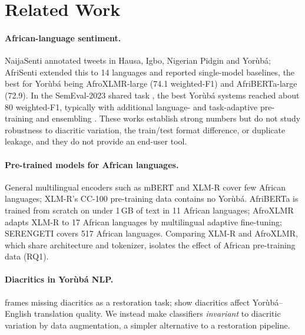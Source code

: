 \documentclass[11pt]{article}
\begin{document}
\section{Related Work}
\paragraph{African-language sentiment.} NaijaSenti \citep{muhammad-etal-2022-naijasenti} annotated tweets in Hausa, Igbo, Nigerian Pidgin and Yorùbá; AfriSenti \citep{muhammad-etal-2023-afrisenti} extended this to 14 languages and reported single-model baselines, the best for Yorùbá being AfroXLMR-large (74.1 weighted-F1) and AfriBERTa-large (72.9). In the SemEval-2023 shared task \citep{muhammad-etal-2023-semeval}, the best Yorùbá systems reached about 80 weighted-F1, typically with additional language- and task-adaptive pre-training and ensembling \citep{wang-etal-2023-nlnde}. These works establish strong numbers but do not study robustness to diacritic variation, the train/test format difference, or duplicate leakage, and they do not provide an end-user tool.

\paragraph{Pre-trained models for African languages.} General multilingual encoders such as mBERT \citep{devlin-etal-2019-bert} and XLM-R \citep{conneau-etal-2020-unsupervised} cover few African languages; XLM-R's CC-100 pre-training data contains no Yorùbá. AfriBERTa \citep{ogueji-etal-2021-small} is trained from scratch on under 1\,GB of text in 11 African languages; AfroXLMR \citep{alabi-etal-2022-adapting} adapts XLM-R to 17 African languages by multilingual adaptive fine-tuning; SERENGETI \citep{adebara-etal-2023-serengeti} covers 517 African languages. Comparing XLM-R and AfroXLMR, which share architecture and tokenizer, isolates the effect of African pre-training data (RQ1).

\paragraph{Diacritics in Yorùbá NLP.} \citet{orife-2018-attentive} frames missing diacritics as a restoration task; \citet{adelani-etal-2021-effect} show diacritics affect Yorùbá--English translation quality. We instead make classifiers \emph{invariant} to diacritic variation by data augmentation, a simpler alternative to a restoration pipeline.
\end{document}
